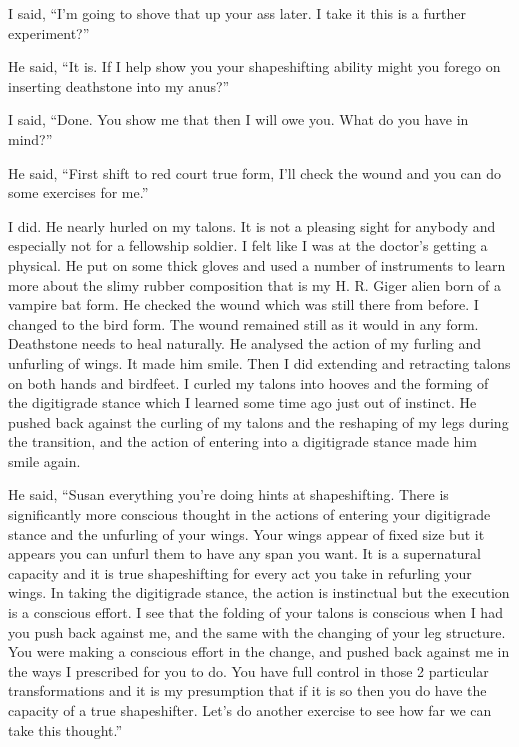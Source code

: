I said, ``I'm going to shove that up your ass later. I take it this is a further experiment?''

He said, ``It is. If I help show you your shapeshifting ability might you forego on inserting deathstone into my anus?''

I said, ``Done. You show me that then I will owe you. What do you have in mind?''

He said, ``First shift to red court true form, I'll check the wound and you can do some exercises for me.''

I did. He nearly hurled on my talons. It is not a pleasing sight for anybody and especially not for a fellowship soldier. I felt like I was at the doctor's getting a physical. He put on some thick gloves and used a number of instruments to learn more about the slimy rubber composition that is my H. R. Giger alien born of a vampire bat form. He checked the wound which was still there from before. I changed to the bird form. The wound remained still as it would in any form. Deathstone needs to heal naturally. He analysed the action of my furling and unfurling of wings. It made him smile. Then I did extending and retracting talons on both hands and birdfeet. I curled my talons into hooves and the forming of the digitigrade stance which I learned some time ago just out of instinct. He pushed back against the curling of my talons and the reshaping of my legs during the transition, and the action of entering into a digitigrade stance made him smile again.

He said, ``Susan everything you're doing hints at shapeshifting. There is significantly more conscious thought in the actions of entering your digitigrade stance and the unfurling of your wings. Your wings appear of fixed size but it appears you can unfurl them to have any span you want. It is a supernatural capacity and it is true shapeshifting for every act you take in refurling your wings. In taking the digitigrade stance, the action is instinctual but the execution is a conscious effort. I see that the folding of your talons is conscious when I had you push back against me, and the same with the changing of your leg structure. You were making a conscious effort in the change, and pushed back against me in the ways I prescribed for you to do. You have full control in those 2 particular transformations and it is my presumption that if it is so then you do have the capacity of a true shapeshifter. Let's do another exercise to see how far we can take this thought.''

